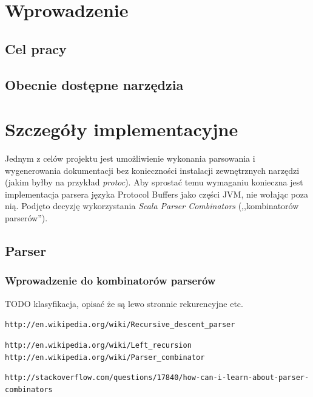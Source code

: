 \chapter{Wprowadzenie}
\label{cha:wprowadzenie}

\section{Cel pracy}
\label{sec:celePracy}


\section{Obecnie dostępne narzędzia}
\label{sec:dostepneNarzedzia}

\chapter{Szczegóły implementacyjne}
\label{sec:zastosowanePodejscie}
Jednym z celów projektu jest umożliwienie wykonania parsowania i wygenerowania dokumentacji bez konieczności
instalacji zewnętrznych narzędzi (jakim byłby na przykład \textit{protoc}). Aby sprostać temu wymaganiu konieczna jest implementacja parsera 
języka Protocol Buffers jako części JVM, nie wołając poza nią. Podjęto decyzję wykorzystania \textit{Scala Parser Combinators} (,,kombinatorów parserów'').


\section{Parser}
\subsection{Wprowadzenie do kombinatorów parserów}
TODO klasyfikacja, opisać że są lewo stronnie rekurencyjne etc.

\verb|http://en.wikipedia.org/wiki/Recursive_descent_parser|

\verb|http://en.wikipedia.org/wiki/Left_recursion|
\verb|http://en.wikipedia.org/wiki/Parser_combinator|

\verb|http://stackoverflow.com/questions/17840/how-can-i-learn-about-parser-combinators|

